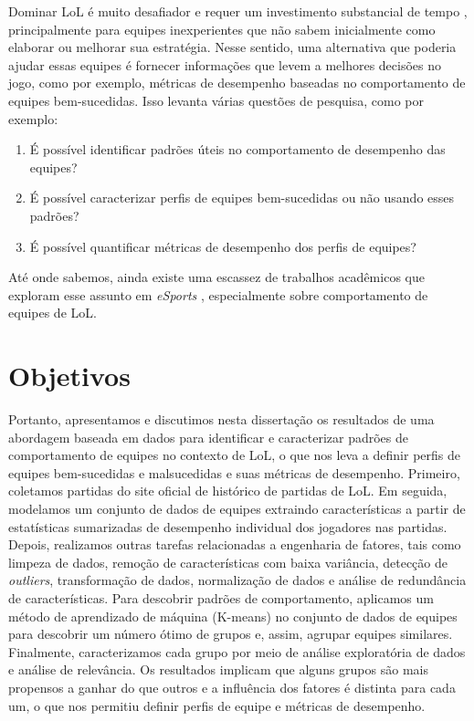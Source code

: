 Dominar LoL é muito desafiador e requer um investimento substancial de tempo \cite{drachen2014skill}, principalmente para equipes inexperientes que não sabem inicialmente como elaborar ou melhorar sua estratégia. Nesse sentido, uma alternativa que poderia ajudar essas equipes é fornecer informações que levem a melhores decisões no jogo, como por exemplo, métricas de desempenho baseadas no comportamento de equipes bem-sucedidas. Isso levanta várias questões de pesquisa, como por exemplo:

\begin{enumerate}[label=(\roman*)]
  \item É possível identificar padrões úteis no comportamento de desempenho das equipes?
  \item É possível caracterizar perfis de equipes bem-sucedidas ou não usando esses padrões?
  \item É possível quantificar métricas de desempenho dos perfis de equipes?
\end{enumerate}

Até onde sabemos, ainda existe uma escassez de trabalhos acadêmicos que exploram esse assunto em \textit{eSports} \cite{drachen2014skill} \cite{ong2015player}, especialmente sobre comportamento de equipes de LoL.

\section{Objetivos}
Portanto, apresentamos e discutimos nesta dissertação os resultados de uma abordagem baseada em dados para identificar e caracterizar padrões de comportamento de equipes no contexto de LoL, o que nos leva a definir perfis de equipes bem-sucedidas e malsucedidas e suas métricas de desempenho. Primeiro, coletamos partidas do site oficial de histórico de partidas de LoL. Em seguida, modelamos um conjunto de dados de equipes extraindo características a partir de estatísticas sumarizadas de desempenho individual dos jogadores nas partidas. Depois, realizamos outras tarefas relacionadas a engenharia de fatores, tais como limpeza de dados, remoção de características com baixa variância, detecção de \textit{outliers}, transformação de dados, normalização de dados e análise de redundância de características. Para descobrir padrões de comportamento, aplicamos um método de aprendizado de máquina (K-means) no conjunto de dados de equipes para descobrir um número ótimo de grupos e, assim, agrupar equipes similares. Finalmente, caracterizamos cada grupo por meio de análise exploratória de dados e análise de relevância. Os resultados implicam que alguns grupos são mais propensos a ganhar do que outros e a influência dos fatores é distinta para cada um, o que nos permitiu definir perfis de equipe e métricas de desempenho.

